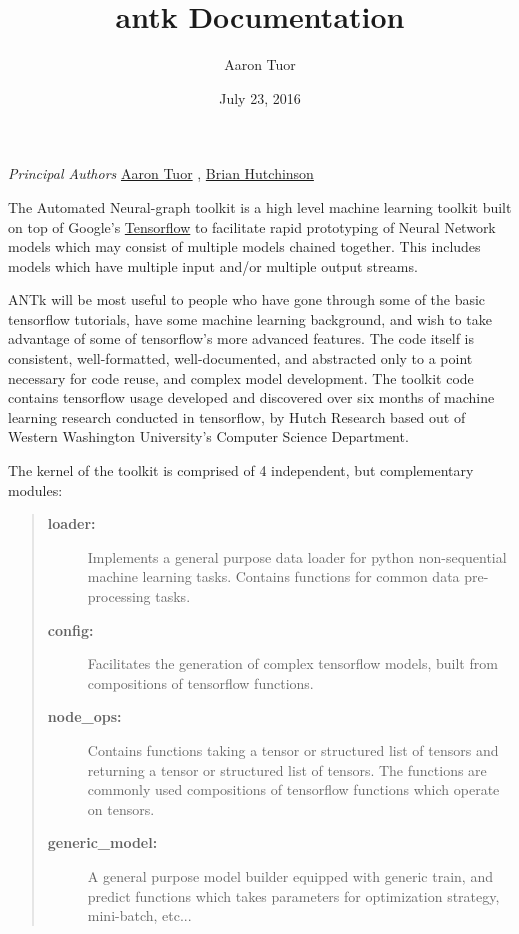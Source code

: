 \documentclass[letterpaper,10pt,english]{sphinxmanual}
\title{antk Documentation}
\date{July 23, 2016}
\author{Aaron Tuor}
\begin{document}
\maketitle
\tableofcontents
{}\label{index::doc}
\emph{Principal Authors} \href{http://sw.cs.wwu.edu/~tuora/aarontuor/}{Aaron Tuor} , \href{http://fw.cs.wwu.edu/~hutchib2/}{Brian Hutchinson}



The Automated Neural-graph toolkit is a high level machine learning toolkit built on top of Google's \href{https://www.tensorflow.org/}{Tensorflow} to
facilitate rapid prototyping of Neural Network models which may consist of multiple models chained together. This includes
models which have multiple input and/or multiple output streams.

ANTk will be most useful to people who have gone through some of the basic tensorflow tutorials, have some machine learning
background, and wish to take advantage
of some of tensorflow's more advanced features. The code itself is consistent, well-formatted, well-documented, and abstracted
only to a point necessary for code reuse, and complex model development. The toolkit code contains tensorflow usage developed and discovered over six
months of machine learning research conducted in tensorflow, by Hutch Research based out of Western Washington University's Computer Science Department.

The kernel of the toolkit is comprised of 4 independent, but
complementary modules:
\begin{quote}
\begin{description}
\item[{\textbf{loader:}}] \leavevmode
Implements a general purpose data loader for python non-sequential machine learning tasks.
Contains functions for common data pre-processing tasks.

\item[{\textbf{config:}}] \leavevmode
Facilitates the generation of complex tensorflow models, built from
compositions of tensorflow functions.

\item[{\textbf{node\_ops:}}] \leavevmode
Contains functions taking a tensor or structured list of tensors and returning a tensor or structured list of tensors.
The functions are commonly used compositions of tensorflow functions which operate on tensors.

\item[{\textbf{generic\_model:}}] \leavevmode
A general purpose model builder equipped with generic train, and predict functions which takes parameters for
optimization strategy, mini-batch, etc...

\end{description}
\end{quote}
\end{document}
